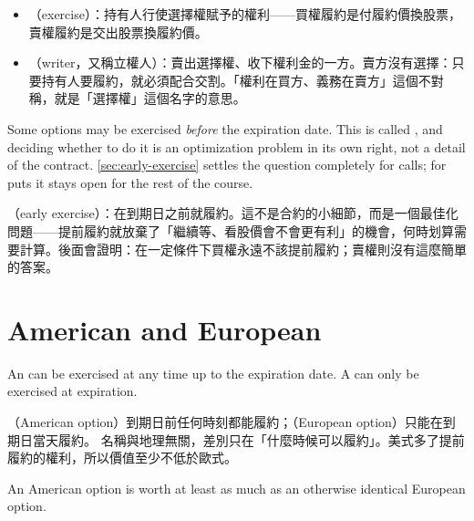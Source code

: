 \begin{remark}
	\begin{itemize}[nosep]
		\item {}（exercise）：持有人行使選擇權賦予的權利——買權履約是付履約價換股票，賣權履約是交出股票換履約價。
		\item {}（writer，又稱立權人）：賣出選擇權、收下權利金的一方。賣方沒有選擇：只要持有人要履約，就必須配合交割。「權利在買方、義務在賣方」這個不對稱，就是「選擇權」這個名字的意思。
	\end{itemize}
\end{remark}
\suppend

Some options may be exercised \emph{before} the expiration date.
\suppstart
This is called , and deciding whether to do it is an optimization problem in its own right, not a detail of the contract.
\autoref{sec:early-exercise} settles the question completely for calls; for puts it stays open for the rest of the course.

\begin{remark}
	（early exercise）：在到期日之前就履約。這不是合約的小細節，而是一個最佳化問題——提前履約就放棄了「繼續等、看股價會不會更有利」的機會，何時划算需要計算。後面會證明：在一定條件下買權永遠不該提前履約；賣權則沒有這麼簡單的答案。
\end{remark}
\suppend

\section{American and European}


\begin{definition}
	An  can be exercised at any time up to the expiration date.
	A  can only be exercised at expiration.
\end{definition}

\suppstart
\begin{remark}
	（American option）到期日前任何時刻都能履約；（European option）只能在到期日當天履約。
	名稱與地理無關，差別只在「什麼時候可以履約」。美式多了提前履約的權利，所以價值至少不低於歐式。
\end{remark}
\suppend

\begin{proposition}
	\label{prop:amer-ge-euro}
	An American option is worth at least as much as an otherwise identical European option.
\end{proposition}

